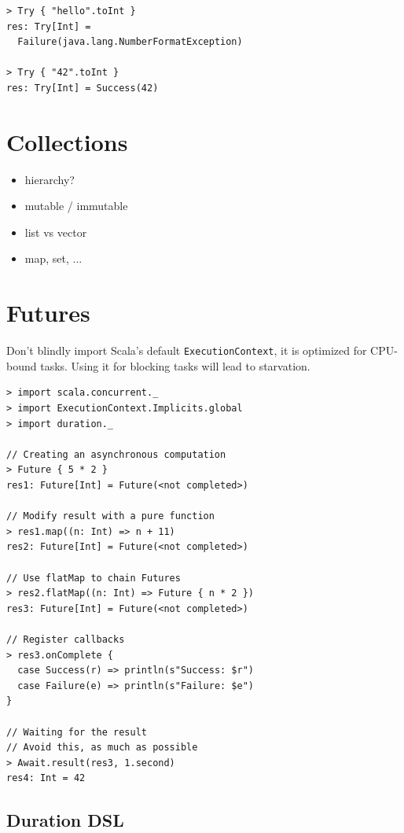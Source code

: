 \documentclass[10pt,landscape,a4paper]{article}
\newcommand{\TODO}[2][]{\todo[inline,color=green!40,linecolor=green!50,#1]{\small TODO #2}}
\begin{document}
\begin{multicols*}{4}
\begin{verbatim}
> Try { "hello".toInt }
res: Try[Int] =
  Failure(java.lang.NumberFormatException)

> Try { "42".toInt }
res: Try[Int] = Success(42)
\end{verbatim}

  \section{Collections}
  \TODO{}

  \begin{itemize}
  \item hierarchy?
  \item mutable / immutable
  \item list vs vector
  \item map, set, ...
  \end{itemize}

  \section{Futures}

  \begin{mdframed}
    Don't blindly import Scala's default \texttt{ExecutionContext}, it
    is optimized for CPU-bound tasks.  Using it for blocking tasks
    will lead to starvation.
  \end{mdframed}

\begin{verbatim}
> import scala.concurrent._
> import ExecutionContext.Implicits.global
> import duration._

// Creating an asynchronous computation
> Future { 5 * 2 }
res1: Future[Int] = Future(<not completed>)

// Modify result with a pure function
> res1.map((n: Int) => n + 11)
res2: Future[Int] = Future(<not completed>)

// Use flatMap to chain Futures
> res2.flatMap((n: Int) => Future { n * 2 })
res3: Future[Int] = Future(<not completed>)

// Register callbacks
> res3.onComplete {
  case Success(r) => println(s"Success: $r")
  case Failure(e) => println(s"Failure: $e")
}

// Waiting for the result
// Avoid this, as much as possible
> Await.result(res3, 1.second)
res4: Int = 42
\end{verbatim}
  \subsection{Duration DSL}


\end{multicols*}
\end{document}
